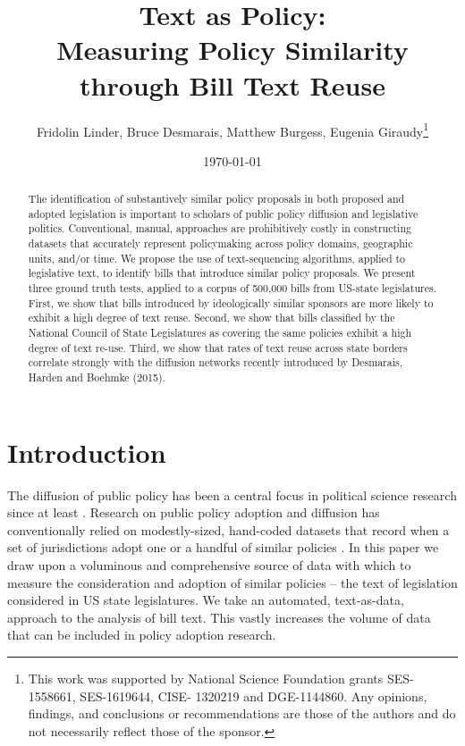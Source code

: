 \documentclass[12pt]{article} %
\begin{document}
 


\title{Text as Policy: \\ Measuring Policy Similarity through Bill Text Reuse}
\date{\today}
\author{Fridolin Linder, Bruce Desmarais, Matthew Burgess, Eugenia
Giraudy\footnote{This work was supported by National Science Foundation grants
SES-1558661, SES-1619644, CISE-
1320219 and DGE-1144860. Any opinions, findings, and conclusions or
recommendations are those of the
authors and do not necessarily reflect those of the sponsor.}}

\maketitle



\singlespacing
\begin{abstract} 
    \noindent The identification of substantively similar policy proposals in both proposed and adopted legislation is important to scholars of public policy diffusion and legislative politics. Conventional, manual, approaches are prohibitively costly in constructing datasets that accurately represent policymaking across policy domains, geographic units, and/or time. We propose the use of text-sequencing algorithms, applied to legislative text, to identify bills that introduce similar policy proposals. We present three ground truth tests, applied to a corpus of 500,000 bills from US-state legislatures. First, we show that bills introduced by ideologically similar sponsors are more likely to exhibit a high degree of text reuse. Second, we show that bills classified by the National Council of State Legislatures as covering the same policies exhibit a high degree of text re-use. Third, we show that rates of text reuse across state borders correlate strongly with the diffusion networks recently introduced by Desmarais, Harden and Boehmke (2015).

\end{abstract}


\doublespacing
\clearpage

\section{Introduction} The diffusion of public policy has been a central focus in political science research since at least \citet{walker1969}. Research on public policy adoption and diffusion has conventionally relied on modestly-sized, hand-coded datasets that record when a set of jurisdictions adopt one or a handful of similar policies \citep{boehmke2012}. In this paper we draw upon a voluminous and comprehensive source of data with which to measure the consideration and adoption of similar policies -- the text of legislation considered in US state legislatures. We take an automated, text-as-data, approach to the analysis of bill text. This vastly increases the volume of data that can be included in policy adoption research. 
\end{document}
